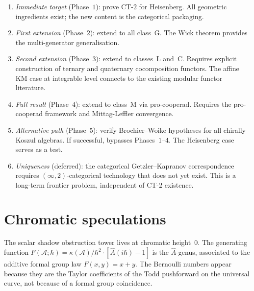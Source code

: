 \documentclass[11pt]{article}
\newcommand{\cA}{\mathcal{A}}
\begin{document}
\begin{enumerate}[label=\textup{(\Roman*)},nosep]
\item \emph{Immediate target} (Phase~$1$): prove CT-$2$ for
  Heisenberg.  All geometric ingredients exist; the new content
  is the categorical packaging.

\item \emph{First extension} (Phase~$2$): extend to all class~G.
  The Wick theorem provides the multi-generator generalisation.

\item \emph{Second extension} (Phase~$3$): extend to classes~L
  and~C.  Requires explicit construction of ternary and quaternary
  cocomposition functors.  The affine KM case at integrable level
  connects to the existing modular functor literature.

\item \emph{Full result} (Phase~$4$): extend to class~M via
  pro-cooperad.  Requires the pro-cooperad framework and
  Mittag-Leffler convergence.

\item \emph{Alternative path} (Phase~$5$): verify
  Brochier--Woike hypotheses for all chirally Koszul algebras.
  If successful, bypasses Phases~$1$--$4$.
  The Heisenberg case serves as a test.

\item \emph{Uniqueness} (deferred): the categorical
  Getzler--Kapranov correspondence requires
  $(\infty,2)$-categorical technology that does not yet exist.
  This is a long-term frontier problem, independent of
  CT-$2$ existence.
\end{enumerate}


\section{Chromatic speculations}
\label{sec:chromatic}

The scalar shadow obstruction tower lives at chromatic height~$0$.  The
generating function
$F(\cA;\hbar) = \kappa(\cA)/\hbar^2 \cdot [\hat{A}(i\hbar) - 1]$
is the $\hat{A}$-genus, associated to the additive formal group
law $F(x,y) = x + y$.  The Bernoulli numbers appear because they
are the Taylor coefficients of the Todd pushforward on the
universal curve, not because of a formal group coincidence.
\end{document}

